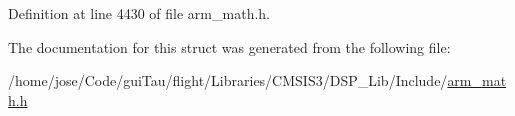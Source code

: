 Definition at line 4430 of file arm\-\_\-math.\-h.



The documentation for this struct was generated from the following file\-:\begin{DoxyCompactItemize}
\item 
/home/jose/\-Code/gui\-Tau/flight/\-Libraries/\-C\-M\-S\-I\-S3/\-D\-S\-P\-\_\-\-Lib/\-Include/\hyperlink{arm__math_8h}{arm\-\_\-math.\-h}\end{DoxyCompactItemize}
